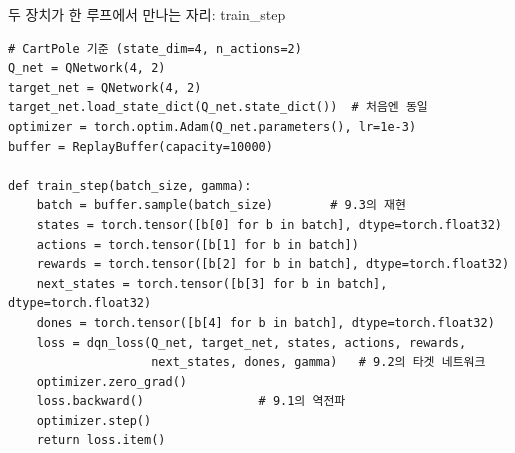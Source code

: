 \documentclass[aspectratio=169,11pt]{beamer}
\begin{document}

\begin{frame}[fragile]{두 장치가 한 루프에서 만나는 자리: train\_step}
\begin{lstlisting}
# CartPole 기준 (state_dim=4, n_actions=2)
Q_net = QNetwork(4, 2)
target_net = QNetwork(4, 2)
target_net.load_state_dict(Q_net.state_dict())  # 처음엔 동일
optimizer = torch.optim.Adam(Q_net.parameters(), lr=1e-3)
buffer = ReplayBuffer(capacity=10000)

def train_step(batch_size, gamma):
    batch = buffer.sample(batch_size)        # 9.3의 재현
    states = torch.tensor([b[0] for b in batch], dtype=torch.float32)
    actions = torch.tensor([b[1] for b in batch])
    rewards = torch.tensor([b[2] for b in batch], dtype=torch.float32)
    next_states = torch.tensor([b[3] for b in batch], dtype=torch.float32)
    dones = torch.tensor([b[4] for b in batch], dtype=torch.float32)
    loss = dqn_loss(Q_net, target_net, states, actions, rewards,
                    next_states, dones, gamma)   # 9.2의 타겟 네트워크
    optimizer.zero_grad()
    loss.backward()                # 9.1의 역전파
    optimizer.step()
    return loss.item()
\end{lstlisting}
\end{frame}
\end{document}
